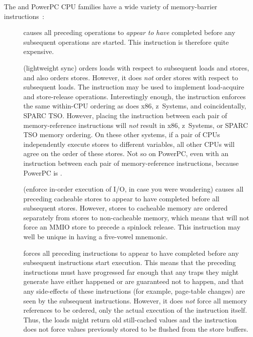 The \Power{} and PowerPC CPU families have a wide variety of memory-barrier
instructions~\cite{PowerPC94,MichaelLyons05a}:
\begin{description}
\item	[] causes all preceding operations to {\em appear to have}
	completed before any subsequent operations are started.
	This instruction is therefore quite expensive.
\item	[] (lightweight sync) orders loads with respect to
	subsequent loads and stores, and also orders stores.
	However, it does {\em not} order stores with respect to subsequent
	loads.
	The  instruction may be used to implement
	load-acquire and store-release operations.
	Interestingly enough, the  instruction enforces
	the same within-CPU ordering as does x86, z~Systems, and coincidentally,
	SPARC TSO\@.
	However, placing the  instruction between each
	pair of memory-reference instructions will \emph{not}
	result in x86, z~Systems, or SPARC TSO memory ordering.
	On these other systems, if a pair of CPUs independently execute
	stores to different variables, all other CPUs will agree on the
	order of these stores.
	Not so on PowerPC, even with an  instruction between each
	pair of memory-reference instructions, because PowerPC is
	.
\item	[] (enforce in-order execution of I/O, in case you
	were wondering) causes all preceding cacheable stores to appear
	to have completed before all subsequent stores.
	However, stores to cacheable memory are ordered separately from
	stores to non-cacheable memory, which means that 
	will not force an MMIO store to precede a spinlock release.
	This instruction may well be unique in having a five-vowel mnemonic.
\item	[] forces all preceding instructions to appear to have
	completed before any subsequent instructions start execution.
	This means that the preceding instructions must have progressed
	far enough that any traps they might generate have either happened
	or are guaranteed not to happen, and that any side-effects of
	these instructions (for example, page-table changes) are seen by the
	subsequent instructions.
	However, it does \emph{not} force all memory references to be
	ordered, only the actual execution of the instruction itself.
	Thus, the loads might return old still-cached values and the
	 instruction does not force values previously stored
	to be flushed from the store buffers.
\end{description}

